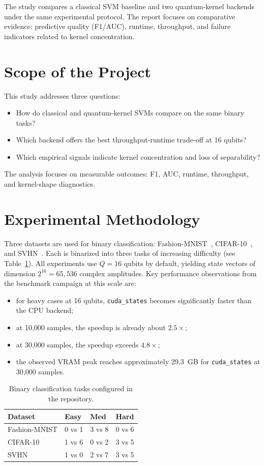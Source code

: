 \documentclass[10pt,twocolumn,letterpaper]{article}
\begin{document}
The study compares a classical SVM baseline and two quantum-kernel backends under the same experimental protocol. The report focuses on comparative evidence: predictive quality (F1/AUC), runtime, throughput, and failure indicators related to kernel concentration.

\section{Scope of the Project}
This study addresses three questions:
\begin{itemize}
    \item How do classical and quantum-kernel SVMs compare on the same binary tasks?
    \item Which backend offers the best throughput-runtime trade-off at 16 qubits?
    \item Which empirical signals indicate kernel concentration and loss of separability?
\end{itemize}

The analysis focuses on measurable outcomes: F1, AUC, runtime, throughput, and kernel-shape diagnostics.

\section{Experimental Methodology}
Three datasets are used for binary classification: Fashion-MNIST~\cite{xiao2017fashion}, CIFAR-10~\cite{krizhevsky2009cifar}, and SVHN~\cite{netzer2011svhn}. Each is binarized into three tasks of increasing difficulty (see Table~\ref{tab:tasks}). All experiments use $Q=16$ qubits by default, yielding state vectors of dimension $2^{16} = 65{,}536$ complex amplitudes. Key performance observations from the benchmark campaign at this scale are:
\begin{itemize}
    \item for heavy cases at 16 qubits, \texttt{cuda\_states} becomes significantly faster than the CPU backend;
    \item at 10,000 samples, the speedup is already about $2.5\times$;
    \item at 30,000 samples, the speedup exceeds $4.8\times$;
    \item the observed VRAM peak reaches approximately \SI{29.3}{GB} for \texttt{cuda\_states} at 30,000 samples.
\end{itemize}

\begin{table}[t]
\centering
\caption{Binary classification tasks configured in the repository.}
\label{tab:tasks}
\small
\begin{tabular}{llll}
\toprule
\textbf{Dataset} & \textbf{Easy} & \textbf{Med} & \textbf{Hard} \\
\midrule
Fashion-MNIST & 0 vs 1 & 3 vs 8 & 0 vs 6 \\
CIFAR-10 & 1 vs 6 & 0 vs 2 & 3 vs 5 \\
SVHN & 1 vs 0 & 2 vs 7 & 3 vs 5 \\
\bottomrule
\end{tabular}
\end{table}
\end{document}
